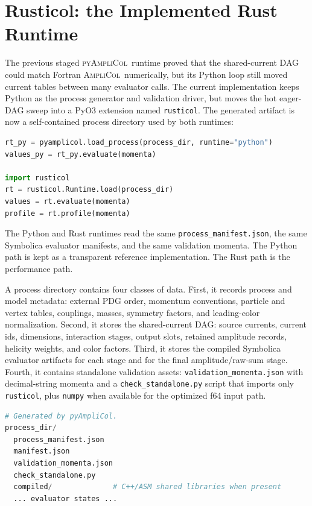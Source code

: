 \documentclass[10pt]{article}
\newcommand{\AC}{\textsc{AmpliCol}}
\newcommand{\PAC}{\textsc{pyAmpliCol}}
\begin{document}
\section{Rusticol: the Implemented Rust Runtime}

The previous staged \PAC\ runtime proved that the shared-current DAG could
match Fortran \AC\ numerically, but its Python loop still moved current tables
between many evaluator calls.  The current implementation keeps Python as the
process generator and validation driver, but moves the hot eager-DAG sweep into
a PyO3 extension named \texttt{rusticol}.  The generated artifact is now a
self-contained process directory used by both runtimes:
\begin{lstlisting}[language=Python]
rt_py = pyamplicol.load_process(process_dir, runtime="python")
values_py = rt_py.evaluate(momenta)

import rusticol
rt = rusticol.Runtime.load(process_dir)
values = rt.evaluate(momenta)
profile = rt.profile(momenta)
\end{lstlisting}
The Python and Rust runtimes read the same \texttt{process\_manifest.json}, the
same Symbolica evaluator manifests, and the same validation momenta.  The
Python path is kept as a transparent reference implementation.  The Rust path is
the performance path.

A process directory contains four classes of data.  First, it records process
and model metadata: external PDG order, momentum conventions, particle and
vertex tables, couplings, masses, symmetry factors, and leading-color
normalization.  Second, it stores the shared-current DAG: source currents,
current ids, dimensions, interaction stages, output slots, retained amplitude
records, helicity weights, and color factors.  Third, it stores the compiled
Symbolica evaluator artifacts for each stage and for the final amplitude/raw-sum
stage.  Fourth, it contains standalone validation assets:
\texttt{validation\_momenta.json} with decimal-string momenta and a
\texttt{check\_standalone.py} script that imports only \texttt{rusticol}, plus
\texttt{numpy} when available for the optimized f64 input path.

\begin{lstlisting}[language=Python]
# Generated by pyAmpliCol.
process_dir/
  process_manifest.json
  manifest.json
  validation_momenta.json
  check_standalone.py
  compiled/              # C++/ASM shared libraries when present
  ... evaluator states ...
\end{lstlisting}
\end{document}
